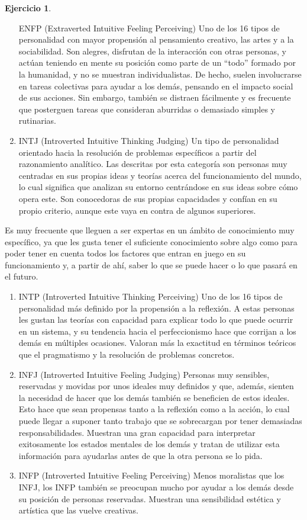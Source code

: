 \documentclass[10pt,]{krantz}
\theoremstyle{definition}
\theoremstyle{definition}
\theoremstyle{definition}
\newtheorem{exercise}{Ejercicio}[chapter]
\theoremstyle{definition}
\theoremstyle{remark}
\begin{document}
\begin{exercise}
\begin{enumerate}
  ENFP (Extraverted Intuitive Feeling Perceiving)
  Uno de los 16 tipos de personalidad con mayor propensión al pensamiento creativo, las artes y a la sociabilidad. Son alegres, disfrutan de la interacción con otras personas, y actúan teniendo en mente su posición como parte de un ``todo'' formado por la humanidad, y no se muestran individualistas. De hecho, suelen involucrarse en tareas colectivas para ayudar a los demás, pensando en el impacto social de sus acciones. Sin embargo, también se distraen fácilmente y es frecuente que posterguen tareas que consideran aburridas o demasiado simples y rutinarias.
\item
  INTJ (Introverted Intuitive Thinking Judging)
  Un tipo de personalidad orientado hacia la resolución de problemas específicos a partir del razonamiento analítico. Las descritas por esta categoría son personas muy centradas en sus propias ideas y teorías acerca del funcionamiento del mundo, lo cual significa que analizan su entorno centrándose en sus ideas sobre cómo opera este. Son conocedoras de sus propias capacidades y confían en su propio criterio, aunque este vaya en contra de algunos superiores.
\end{enumerate}

Es muy frecuente que lleguen a ser expertas en un ámbito de conocimiento muy específico, ya que les gusta tener el suficiente conocimiento sobre algo como para poder tener en cuenta todos los factores que entran en juego en su funcionamiento y, a partir de ahí, saber lo que se puede hacer o lo que pasará en el futuro.

\begin{enumerate}
\def\labelenumi{\arabic{enumi}.}
\setcounter{enumi}{13}
\item
  INTP (Introverted Intuitive Thinking Perceiving)
  Uno de los 16 tipos de personalidad más definido por la propensión a la reflexión. A estas personas les gustan las teorías con capacidad para explicar todo lo que puede ocurrir en un sistema, y su tendencia hacia el perfeccionismo hace que corrijan a los demás en múltiples ocasiones. Valoran más la exactitud en términos teóricos que el pragmatismo y la resolución de problemas concretos.
\item
  INFJ (Introverted Intuitive Feeling Judging)
  Personas muy sensibles, reservadas y movidas por unos ideales muy definidos y que, además, sienten la necesidad de hacer que los demás también se beneficien de estos ideales. Esto hace que sean propensas tanto a la reflexión como a la acción, lo cual puede llegar a suponer tanto trabajo que se sobrecargan por tener demasiadas responsabilidades. Muestran una gran capacidad para interpretar exitosamente los estados mentales de los demás y tratan de utilizar esta información para ayudarlas antes de que la otra persona se lo pida.
\item
  INFP (Introverted Intuitive Feeling Perceiving)
  Menos moralistas que los INFJ, los INFP también se preocupan mucho por ayudar a los demás desde su posición de personas reservadas. Muestran una sensibilidad estética y artística que las vuelve creativas.
\end{enumerate}
\end{exercise}
\end{document}
